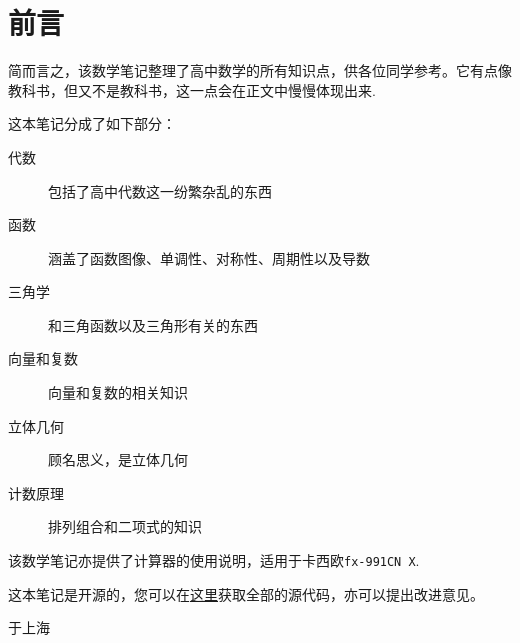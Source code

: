 \section*{前言}
简而言之，该数学笔记整理了高中数学的所有知识点，供各位同学参考。它有点像教科书，但又不是教科书，这一点会在正文中慢慢体现出来.

这本笔记分成了如下部分：

\begin{description}
	\item[代数] 包括了高中代数这一纷繁杂乱的东西
	\item[函数] 涵盖了函数图像、单调性、对称性、周期性以及导数
	\item[三角学] 和三角函数以及三角形有关的东西
	\item[向量和复数] 向量和复数的相关知识
	\item[立体几何] 顾名思义，是立体几何
	\item[计数原理] 排列组合和二项式的知识
\end{description}

该数学笔记亦提供了计算器的使用说明，适用于卡西欧\verb|fx-991CN X|.

这本笔记是开源的，您可以在\href{https://github.com/jason-bowen-zheng/math-notes}{这里}获取全部的源代码，亦可以提出改进意见。
\hypersetup{hidelinks}

\begin{flushright}
	\date{2022年11月}于上海
\end{flushright}

